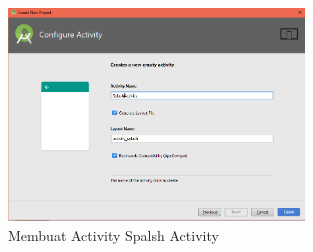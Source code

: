 \begin{enumerate}
       \begin{figure}[H]
        \centering
        \includegraphics[width=0.7\textwidth]{figures/android27.png}
        \caption{Membuat Activity Spalsh Activity}
        \label{print}
        \end{figure}
    

\end{enumerate}
